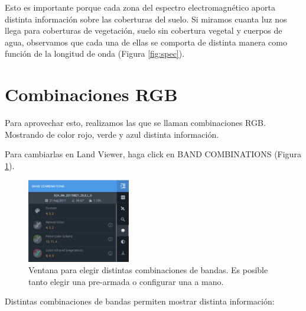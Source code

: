 \documentclass[a4paper,12pt]{book}
\begin{document}
Esto es importante porque cada zona del espectro electromagnético aporta distinta información sobre las coberturas del suelo. Si miramos cuanta luz nos llega para coberturas de vegetación, suelo sin cobertura vegetal y cuerpos de agua, observamos que cada una de ellas se comporta de distinta manera como función de la longitud de onda (Figura \ref{fig:spec}).

\section{Combinaciones RGB}

Para aprovechar esto, realizamos las que se llaman combinaciones RGB. Mostrando de color rojo, verde y azul distinta información.

Para cambiarlas en Land Viewer, haga click en BAND COMBINATIONS (Figura \ref{fig:bandas}).

\begin{figure}[h!]
    \centering
    \includegraphics[width=0.4\textwidth]{fig:bandas.png}
    \caption{Ventana para elegir distintas combinaciones de bandas. Es posible tanto elegir una pre-armada o configurar una a mano.}
    \label{fig:bandas}
\end{figure}

Distintas combinaciones de bandas permiten mostrar distinta información:
\end{document}
